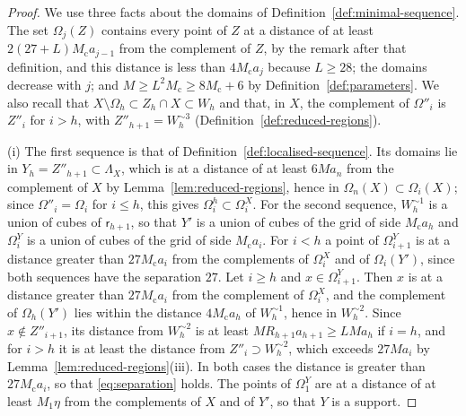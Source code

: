 \documentclass[11pt]{preprint}
\numberwithin{equation}{section}
\begin{document}
\begin{proof}
We use three facts about the domains of Definition~\ref{def:minimal-sequence}. The set $\Omega_j(Z)$ contains every point of $Z$ at a distance of at least $2(27 + L)M_{\mathrm c}a_{j-1}$ from the complement of $Z$, by the remark after that definition, and this distance is less than $4M_{\mathrm c}a_j$ because $L \geqslant 28$; the domains decrease with $j$; and $M \geqslant L^2M_{\mathrm c} \geqslant 8M_{\mathrm c} + 6$ by Definition~\ref{def:parameters}. We also recall that $X \setminus \Omega_h \subset Z_h \cap X \subset W_h$ and that, in $X$, the complement of $\Omega''_i$ is $Z''_i$ for $i > h$, with $Z''_{h+1} = W_h^{\sim3}$ (Definition~\ref{def:reduced-regions}).

(i) The first sequence is that of Definition~\ref{def:localised-sequence}. Its domains lie in $Y_h = Z''_{h+1} \subset \Lambda_X$, which is at a distance of at least $6Ma_n$ from the complement of $X$ by Lemma~\ref{lem:reduced-regions}, hence in $\Omega_n(X) \subset \Omega_i(X)$; since $\Omega''_i = \Omega_i$ for $i \leqslant h$, this gives $\Omega^h_i \subset \Omega^X_i$. For the second sequence, $W_h^{\sim1}$ is a union of cubes of $\mathsf r_{h+1}$, so that $Y'$ is a union of cubes of the grid of side $M_{\mathrm c}a_h$ and $\Omega^Y_i$ is a union of cubes of the grid of side $M_{\mathrm c}a_i$. For $i < h$ a point of $\Omega^Y_{i+1}$ is at a distance greater than $27M_{\mathrm c}a_i$ from the complements of $\Omega^X_i$ and of $\Omega_i(Y')$, since both sequences have the separation $27$. Let $i \geqslant h$ and $x \in \Omega^Y_{i+1}$. Then $x$ is at a distance greater than $27M_{\mathrm c}a_i$ from the complement of $\Omega^X_i$, and the complement of $\Omega_h(Y')$ lies within the distance $4M_{\mathrm c}a_h$ of $W_h^{\sim1}$, hence in $W_h^{\sim2}$. Since $x \notin Z''_{i+1}$, its distance from $W_h^{\sim2}$ is at least $MR_{h+1}a_{h+1} \geqslant LMa_h$ if $i = h$, and for $i > h$ it is at least the distance from $Z''_i \supset W_h^{\sim2}$, which exceeds $27Ma_i$ by Lemma~\ref{lem:reduced-regions}(iii). In both cases the distance is greater than $27M_{\mathrm c}a_i$, so that \eqref{eq:separation} holds. The points of $\Omega^Y_1$ are at a distance of at least $M_1\eta$ from the complements of $X$ and of $Y'$, so that $Y$ is a support.


\end{proof}
\end{document}
